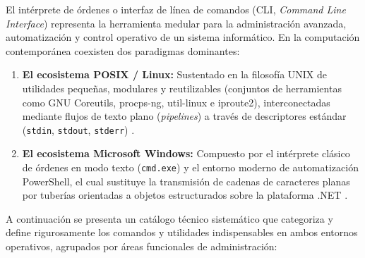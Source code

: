 \documentclass[12pt]{article}
\begin{document}
El intérprete de órdenes o interfaz de línea de comandos (CLI, \textit{Command Line Interface}) representa la herramienta medular para la administración avanzada, automatización y control operativo de un sistema informático. En la computación contemporánea coexisten dos paradigmas dominantes:
\begin{enumerate}[leftmargin=*]
    \item \textbf{El ecosistema POSIX / Linux:} Sustentado en la filosofía UNIX de utilidades pequeñas, modulares y reutilizables (conjuntos de herramientas como GNU Coreutils, procps-ng, util-linux e iproute2), interconectadas mediante flujos de texto plano (\textit{pipelines}) a través de descriptores estándar (\texttt{stdin}, \texttt{stdout}, \texttt{stderr}) \parencite[\S 1.2, p.\ 3]{stallings2018operating}.
    \item \textbf{El ecosistema Microsoft Windows:} Compuesto por el intérprete clásico de órdenes en modo texto (\texttt{cmd.exe}) y el entorno moderno de automatización PowerShell, el cual sustituye la transmisión de cadenas de caracteres planas por tuberías orientadas a objetos estructurados sobre la plataforma .NET \parencite[\S 21.2, p.\ 1039]{deitel2004operating}.
\end{enumerate}

A continuación se presenta un catálogo técnico sistemático que categoriza y define rigurosamente los comandos y utilidades indispensables en ambos entornos operativos, agrupados por áreas funcionales de administración:
\end{document}
